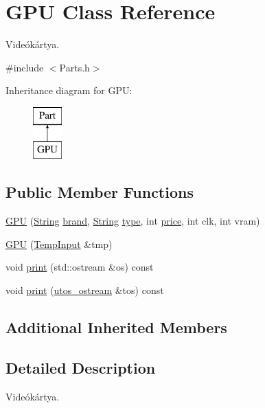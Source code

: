 \hypertarget{class_g_p_u}{}\section{G\+PU Class Reference}
\label{class_g_p_u}


Videókártya.  




{\ttfamily \#include $<$Parts.\+h$>$}

Inheritance diagram for G\+PU\+:\begin{figure}[H]
\begin{center}
\leavevmode
\includegraphics[height=2.000000cm]{class_g_p_u}
\end{center}
\end{figure}
\subsection*{Public Member Functions}
\begin{DoxyCompactItemize}
\item 
\mbox{\hyperlink{class_g_p_u_a358f512b1583399e68f76248bb305e61}{G\+PU}} (\mbox{\hyperlink{class_string}{String}} \mbox{\hyperlink{class_part_ae06f2fdeb7fbbdb229a7aca151f3e341}{brand}}, \mbox{\hyperlink{class_string}{String}} \mbox{\hyperlink{class_part_a101dbcc5c4b21564df7414c7eb0eae88}{type}}, int \mbox{\hyperlink{class_part_a8e71223aed1da95a974f33d8d6c91bb1}{price}}, int clk, int vram)
\item 
\mbox{\hyperlink{class_g_p_u_a9b1632e965c26051ae583c9b5e1c2e3c}{G\+PU}} (\mbox{\hyperlink{struct_temp_input}{Temp\+Input}} \&tmp)
\item 
void \mbox{\hyperlink{class_g_p_u_abfa2a8fa30047e9759080d724e4b3820}{print}} (std\+::ostream \&os) const
\item 
void \mbox{\hyperlink{class_g_p_u_acfa9ab35cdf1c25c324fc39c6ffc2412}{print}} (\mbox{\hyperlink{structutos__ostream}{utos\+\_\+ostream}} \&tos) const
\end{DoxyCompactItemize}
\subsection*{Additional Inherited Members}


\subsection{Detailed Description}
Videókártya. 

